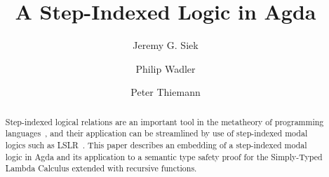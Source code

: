 \documentclass[acmsmall]{acmart}
\begin{document}
\title{A Step-Indexed Logic in Agda}

\author{Jeremy G. Siek}

\author{Philip Wadler}

\author{Peter Thiemann}


\begin{abstract}
  Step-indexed logical relations are an important tool in the
  metatheory of programming
  languages~\citep{Appel:2001aa,Ahmed:2006aa}, and their application
  can be streamlined by use of step-indexed modal logics such as
  LSLR~\citep{Dreyer:2011wl}.  This paper describes an embedding of a
  step-indexed modal logic in Agda and its application to a semantic
  type safety proof for the Simply-Typed Lambda Calculus extended with
  recursive functions.
\end{abstract}


\end{document}
